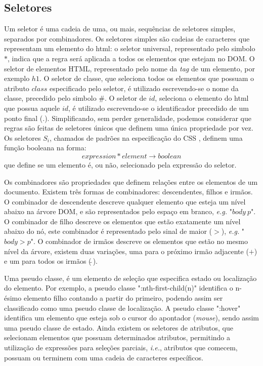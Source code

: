 \subsection{Seletores}
\label{subsec:seletores}
Um seletor é uma cadeia de uma, ou mais, sequências de seletores simples, separados por combinadores. Os seletores simples são cadeias de caracteres que representam um elemento do html: o seletor universal, representado pelo simbolo \(\ast\), indica que a regra será aplicada a todos os elementos que estejam no DOM. O seletor de elementos HTML, representado pelo nome da \textit{tag} de um elemento, por exemplo \(h1\). O seletor de classe, que seleciona todos os elementos que possuam o atributo \(class\) especificado pelo seletor, é utilizado escrevendo-se o nome da classe, precedido pelo simbolo \(\#\). O seletor de \(id\), seleciona o elemento do html que possua aquele \(id\), é utilizado escrevendo-se o identificador precedido de um ponto final (\(.\)). 
Simplificando, sem perder generalidade, podemos considerar que regras são feitas de seletores únicos que definem uma única propriedade por vez. Os seletores \(S_i\), chamados de padrões na especificação do CSS \cite{CSSspec2009}, definem uma função booleana na forma:
\begin{equation}
	expression * element \rightarrow boolean
\end{equation}
que define se um elemento é, ou não, selecionado pela expressão do seletor.

Os combinadores são propriedades que definem relações entre os elementos de um documento. Existem três formas de combinadores: descendentes, filhos e irmãos. O combinador de descendente descreve qualquer elemento que esteja um nível abaixo na árvore DOM, e são representados pelo espaço em branco, \textit{e.g.} "$body\ p$". O combinador de filho descreve os elementos que estão exatamente um nível abaixo do nó, este combinador é representado pelo sinal de maior ($>$), \textit{e.g.} "$body > p$". O combinador de irmãos descreve os elementos que estão no mesmo nível da árvore, existem duas variações, uma para o próximo irmão adjacente ($+$) e um para todos os irmãos ($\tilde{~}$).

Uma pseudo classe, é um elemento de seleção que especifica estado ou localização do elemento. Por exemplo, a pseudo classe ":nth-first-child(n)" identifica o n-ésimo elemento filho contando a partir do primeiro, podendo assim ser classificado como uma pseudo classe de localização. A pseudo classe ":hover" identifica um elemento que esteja sob o cursor do apontador (\textit{mouse}), sendo assim uma pseudo classe de estado. Ainda existem os seletores de atributos, que selecionam elementos que possuam determinados atributos, permitindo a utilização de expressões para seleções parciais, \textit{i.e.}, atributos que comecem, possuam ou terminem com uma cadeia de caracteres específicos.

